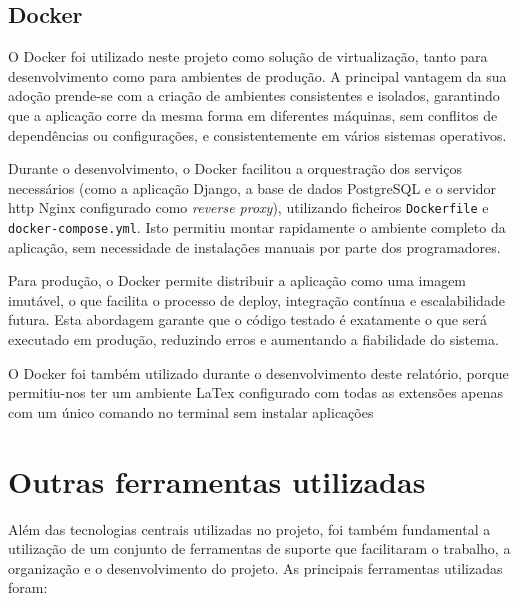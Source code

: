 \subsection{Docker}

O Docker foi utilizado neste projeto como solução de virtualização, tanto para desenvolvimento como para ambientes de produção. A principal vantagem da sua adoção prende-se com a criação de ambientes consistentes e isolados, garantindo que a aplicação corre da mesma forma em diferentes máquinas, sem conflitos de dependências ou configurações, e consistentemente em vários sistemas operativos.

Durante o desenvolvimento, o Docker facilitou a orquestração dos serviços necessários (como a aplicação Django, a base de dados PostgreSQL e o servidor \gls{http} Nginx configurado como \textit{reverse proxy}), utilizando ficheiros \texttt{Dockerfile} e \texttt{docker-compose.yml}. Isto permitiu montar rapidamente o ambiente completo da aplicação, sem necessidade de instalações manuais por parte dos programadores.

Para produção, o Docker permite distribuir a aplicação como uma imagem imutável, o que facilita o processo de deploy, integração contínua e escalabilidade futura. Esta abordagem garante que o código testado é exatamente o que será executado em produção, reduzindo erros e aumentando a fiabilidade do sistema.

O Docker foi também utilizado durante o desenvolvimento deste relatório, porque permitiu-nos ter um ambiente LaTex configurado com todas as extensões apenas com um único comando no terminal sem instalar aplicações


\section{Outras ferramentas utilizadas}
\label{sec:tools}

Além das tecnologias centrais utilizadas no projeto, foi também fundamental a utilização de um conjunto de ferramentas de suporte que facilitaram o trabalho, a organização e o desenvolvimento do projeto. As principais ferramentas utilizadas foram:

